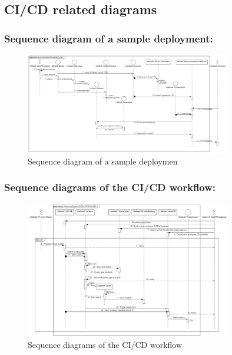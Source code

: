 \subsection{CI/CD related diagrams}

\subsubsection{Sequence diagram of a sample deployment: }

\begin{figure}[!ht]\centering
\includegraphics[width=0.8\textwidth,angle=00]{assets/f4.jpg}
\caption{Sequence diagram of a sample deploymen}
\label{fig:f4}
\end{figure}

\newpage 
\subsubsection{Sequence diagrams of the CI/CD workflow: }

\begin{figure}[!ht]\centering
\includegraphics[width=0.8\textwidth,angle=00]{assets/f5.jpg}
\caption{Sequence diagrams of the CI/CD workflow}
\label{fig:f5}
\end{figure}


